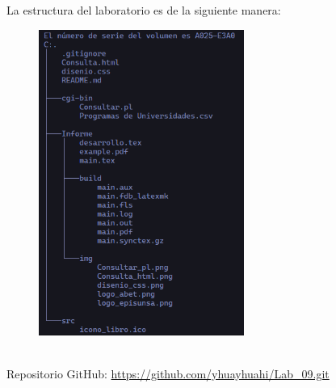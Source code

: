La estructura del laboratorio es de la siguiente manera:
\begin{figure}[h!]
    \centering
    \includegraphics[width=0.6\textwidth,keepaspectratio]{img/Estructura.png}
\end{figure}
\\
Repositorio GitHub:
\url{https://github.com/yhuayhuahi/Lab_09.git}

